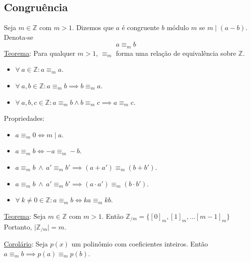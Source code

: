 \documentclass{article}
\begin{document}
\subsection{Congruência}
Seja $m \in \mathbb{Z}$ com $m > 1$. Dizemos que $a$ é congruente $b$ módulo $m$ se $m \mid (a - b)$. Denota-se
\[ a \equiv_m b \]
\uline{Teorema}: Para qualquer $m > 1$, $\equiv_m$ forma uma relação de equivalência sobre $\mathbb{Z}$.
\begin{itemize}
  \item $\forall \: a \in \mathbb{Z}: a \equiv_m a$.
  \item $\forall \: a,b \in \mathbb{Z}: a \equiv_m b \implies b \equiv_m a$.
  \item $\forall \: a,b,c \in \mathbb{Z}: a \equiv_m b \land b \equiv_m c \implies a \equiv_m c$.
\end{itemize}
\vspace{5pt}
Propriedades:
\begin{itemize}
  \item $a \equiv_m 0 \iff m \mid a$.
  \item $a \equiv_m b \iff -a \equiv_m -b$.
  \item $a \equiv_m b \:\land\: a' \equiv_m b' \implies (a + a') \equiv_m (b + b')$.
  \item $a \equiv_m b \:\land\: a' \equiv_m b' \implies (a \cdot a') \equiv_m (b \cdot b')$.
  \item $\forall \: k \neq 0 \in \mathbb{Z}: a \equiv_m b \iff ka \equiv_m kb$.
\end{itemize}
\vspace{-2pt}
\begin{tabbing}
  \uline{Teorema}: \= Seja $m \in \mathbb{Z}$ com $m > 1$. Então $\mathbb{Z}_{/m} = \{ {[0]}_m, {[1]}_m, \hdots {[m - 1]}_m \}$ \\[5pt]
  \> Portanto, $\big| \mathbb{Z}_{/m} \big| = m$.
\end{tabbing}
\uline{Corolário}: Seja $p(x)$ um polinômio com coeficientes inteiros. Então $a \equiv_m b \implies p(a) \equiv_m p(b)$.
\end{document}
